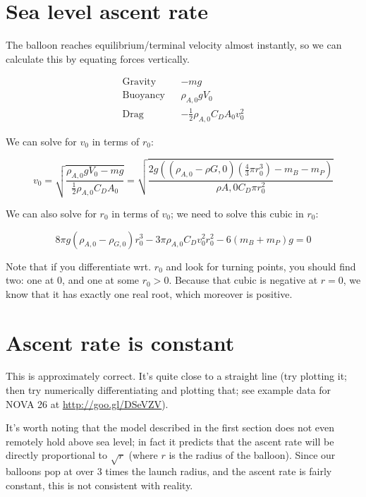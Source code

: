 \documentclass{article}
\begin{document}
\section{Sea level ascent rate}

The balloon reaches equilibrium/terminal velocity almost instantly,
so we can calculate this by equating forces vertically.

\begin{align*}
    \text{Gravity} && -mg \\
    \text{Buoyancy} && \rho_{A,0} g V_0 \\
    \text{Drag} && -\frac{1}{2} \rho_{A,0} C_D A_0 v_0^2
\end{align*}

We can solve for $v_0$ in terms of $r_0$:

\[
    v_0
    = \sqrt{
        \frac{ \rho_{A,0}gV_0 - mg }%
             { \frac{1}{2} \rho_{A,0} C_D A_0 }
        }
%
    = \sqrt{
        \frac{ 2g ((\rho_{A,0} - \rho{G,0}) (\frac{4}{3} \pi r_0^3) - m_B - m_P) }%
             { \rho{A,0} C_D \pi r_0^2 }
        }
\]

We can also solve for $r_0$ in terms of $v_0$; we need to solve this cubic in $r_0$:

\[
       8 \pi g (\rho_{A,0} - \rho_{G,0}) r_0^3
     - 3 \pi \rho_{A,0} C_D v_0^2 r_0 ^2
     - 6 (m_B + m_P) g
      = 0
\]

Note that if you differentiate wrt. $r_0$ and look for turning points, you should find two:
one at $0$, and one at some $r_0 > 0$. Because that cubic is negative at $r = 0$, we know
that it has exactly one real root, which moreover is positive.

\section{Ascent rate is constant}

This is approximately correct. It's quite close to a straight line
(try plotting it; then try numerically differentiating and plotting that; see example data
for NOVA 26 at
\underline{\href{http://nbviewer.ipython.org/github/danielrichman/burst-calc-notes/blob/master/actual-data.ipynb}{http://goo.gl/DSeVZV}}).

It's worth noting that the model described in the first section does not even remotely hold
above sea level; in fact it predicts that the ascent rate will be directly proportional
to $\sqrt{r}$ (where $r$ is the radius of the balloon). Since our balloons pop at over
$3$ times the launch radius, and the ascent rate is fairly constant,
this is not consistent with reality.
\end{document}
